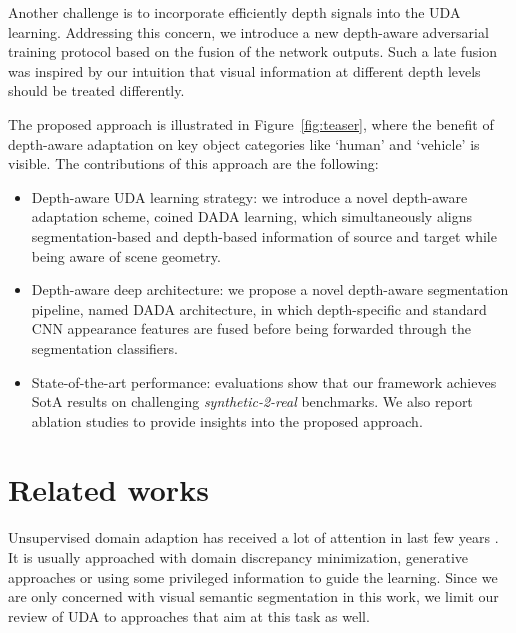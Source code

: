\documentclass[10pt,twocolumn,letterpaper]{article}
\begin{document}
Another challenge is to incorporate efficiently depth signals into the UDA learning. Addressing this concern, we introduce a new depth-aware adversarial training protocol based on the fusion of the network outputs.
Such a late fusion was inspired by our intuition that visual information at different depth levels should be treated differently.

The proposed approach is illustrated in Figure~\ref{fig:teaser}, where the benefit of depth-aware adaptation on key object categories like `human' and `vehicle' is visible. The contributions of this approach are the following: 
\begin{itemize}
	\setlength{\parskip}{0pt}
	\setlength{\itemsep}{1pt}
	\item Depth-aware UDA learning strategy: we introduce a novel depth-aware adaptation scheme, coined DADA learning, which simultaneously aligns segmentation-based and depth-based information of source and target while being aware of scene geometry.
	\item Depth-aware deep architecture: we propose a novel depth-aware segmentation pipeline, named DADA architecture, in which depth-specific and standard CNN appearance features are fused before being forwarded through the segmentation classifiers.
	\item State-of-the-art performance: evaluations show that our framework achieves SotA results on challenging \textit{synthetic-2-real} benchmarks. We also report ablation studies to provide insights into the proposed approach.
\end{itemize} 	
	\section{Related works}
	Unsupervised domain adaption has received a lot of attention in last few years \cite{csurka2017domain, ganin2015unsupervised, hoffman2016fcns, long2016unsupervised, tzeng2017adversarial, yan2017mind}. It is usually approached with domain discrepancy minimization, generative approaches or using some privileged information to guide the learning. Since we are only concerned with visual semantic segmentation in this work, we limit our review of UDA to approaches that aim at this task as well.
\end{document}
